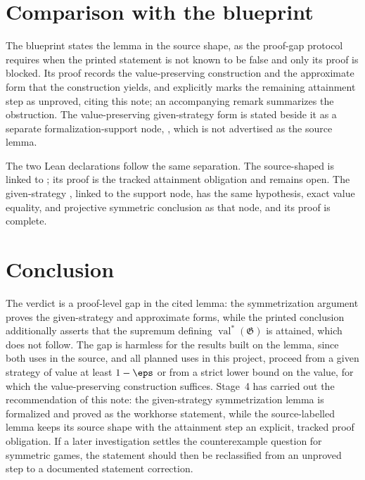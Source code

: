 \documentclass[11pt]{article}
\newcommand{\val}{\operatorname{val}}
\newcommand{\game}{\mathfrak{G}}
\begin{document}
\section{Comparison with the blueprint}

The blueprint \cite{MIPStarREBlueprint} states the lemma in the source shape,
as the proof-gap protocol requires when the printed statement is not known to
be false and only its proof is blocked.  Its proof records the
value-preserving construction and the approximate form that the construction
yields, and explicitly marks the remaining attainment step as unproved, citing
this note; an accompanying remark summarizes the obstruction.  The
value-preserving given-strategy form is stated beside it as a separate
formalization-support node, , which
is not advertised as the source lemma.

The two Lean declarations follow the same separation.  The source-shaped
 is linked to
; its proof is the tracked attainment obligation and
remains open.  The given-strategy
, linked to the
support node, has the same hypothesis, exact value equality, and projective
symmetric conclusion as that node, and its proof is complete.

\section{Conclusion}

The verdict is a proof-level gap in the cited lemma: the symmetrization
argument proves the given-strategy and approximate forms, while the printed
conclusion additionally asserts that the supremum defining $\val^*(\game)$ is
attained, which does not follow.  The gap is harmless for the results built
on the lemma, since both uses in the source, and all planned uses in this
project, proceed from a given strategy of value at least $1-\eps$ or from a
strict lower bound on the value, for which the value-preserving construction
suffices.  Stage~4 has carried out the recommendation of this note: the
given-strategy symmetrization lemma is formalized and proved as the workhorse
statement, while the source-labelled lemma keeps its source shape with the
attainment step an explicit, tracked proof obligation.  If a later
investigation settles the counterexample question for symmetric games, the
statement should then be reclassified from an unproved step to a documented
statement correction.



\end{document}
